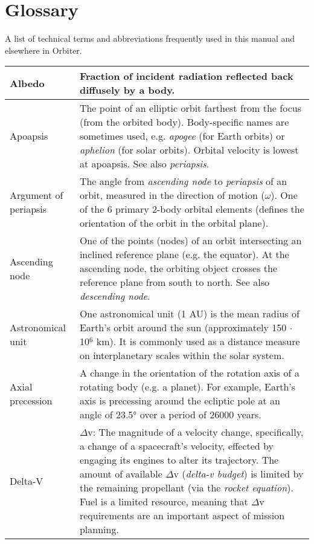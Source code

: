 \documentclass[Orbiter User Manual.tex]{subfiles}
\begin{document}
\section{Glossary}
A list of technical terms and abbreviations frequently used in this manual and elsewhere in Orbiter.

	\begin{longtable}{ |p{}|p{}| }
	\hline\rule{0pt}{2ex}
	Albedo & Fraction of incident radiation reflected back diffusely by a body.\\
	\hline\rule{0pt}{2ex}
	Apoapsis & The point of an elliptic orbit farthest from the focus (from the orbited body). Body-specific names are sometimes used, e.g. \textit{apogee} (for Earth orbits) or \textit{aphelion} (for solar orbits). Orbital velocity is lowest at apoapsis. See also \textit{periapsis}.\\
	\hline\rule{0pt}{2ex}
	Argument of periapsis & The angle from \textit{ascending node} to \textit{periapsis} of an orbit, measured in the direction of motion ($\omega$). One of the 6 primary 2-body orbital elements (defines the orientation of the orbit in the orbital plane).\\
	\hline\rule{0pt}{2ex}
	Ascending node & One of the points (nodes) of an orbit intersecting an inclined reference plane (e.g. the equator). At the ascending node, the orbiting object crosses the reference plane from south to north. See also \textit{descending node}.\\
	\hline\rule{0pt}{2ex}
	Astronomical unit & One astronomical unit (1 AU) is the mean radius of Earth's orbit around the sun (approximately 150 $\cdot$ 10$^{6}$ km). It is commonly used as a distance measure on interplanetary scales within the solar system.\\
	\hline\rule{0pt}{2ex}
	Axial precession & A change in the orientation of the rotation axis of a rotating body (e.g. a planet). For example, Earth's axis is precessing around the ecliptic pole at an angle of 23.5° over a period of 26000 years.\\
	\hline\rule{0pt}{2ex}
	Delta-V & $\Delta$v: The magnitude of a velocity change, specifically, a change of a spacecraft's velocity, effected by engaging its engines to alter its trajectory. The amount of  available $\Delta$v (\textit{delta-v budget}) is limited by the remaining propellant (via the \textit{rocket equation}). Fuel is a limited resource, meaning that $\Delta$v requirements are an important aspect of mission planning.\\

\end{longtable}
\end{document}
